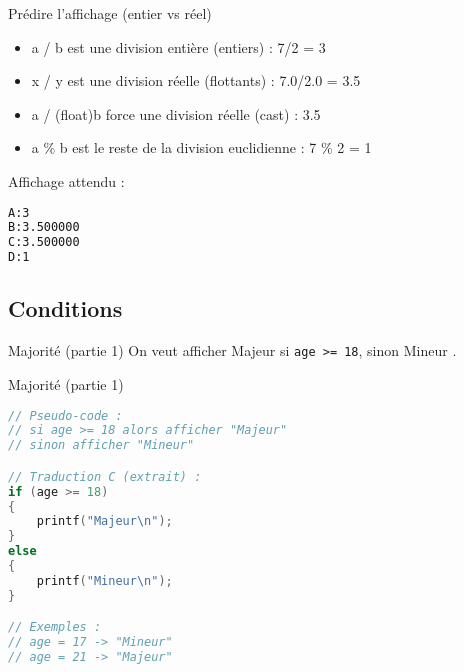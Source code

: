 \begin{UPSTIprofOnlyEnv}
    \begin{UPSTIcorrectionP}{Prédire l'affichage (entier vs réel)}
        \begin{itemize}
            \item a / b est une division entière (entiers) : 7/2 = 3
            \item x / y est une division réelle (flottants) : 7.0/2.0 = 3.5
            \item a / (float)b force une division réelle (cast) : 3.5
            \item a \% b est le reste de la division euclidienne : 7 \% 2 = 1
        \end{itemize}
        Affichage attendu :
        \begin{lstlisting}[language=bash]
A:3
B:3.500000
C:3.500000
D:1
\end{lstlisting}
    \end{UPSTIcorrectionP}
\end{UPSTIprofOnlyEnv}



\subsection{Conditions}

\begin{UPSTIexercice}{Majorité (partie 1)}
    On veut afficher \og Majeur \fg{} si \verb|age >= 18|, sinon \og Mineur \fg{}.
\end{UPSTIexercice}

\begin{UPSTIprofOnlyEnv}
    \begin{UPSTIcorrectionP}{Majorité (partie 1)}
        \begin{lstlisting}[language=C]
// Pseudo-code :
// si age >= 18 alors afficher "Majeur"
// sinon afficher "Mineur"

// Traduction C (extrait) :
if (age >= 18)
{
    printf("Majeur\n");
}
else
{
    printf("Mineur\n");
}

// Exemples :
// age = 17 -> "Mineur"
// age = 21 -> "Majeur"
        \end{lstlisting}
    \end{UPSTIcorrectionP}
\end{UPSTIprofOnlyEnv}


